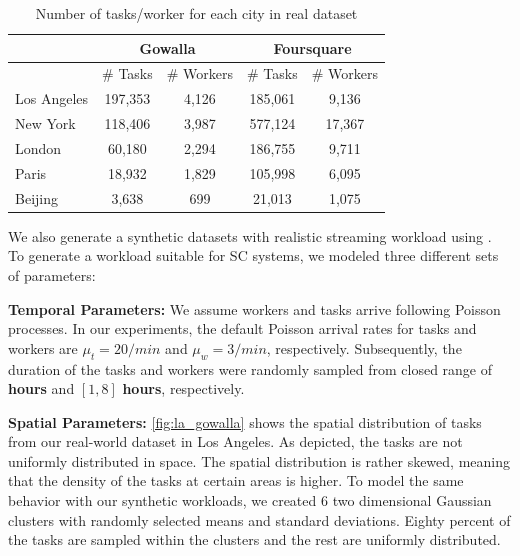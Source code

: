 \begin{table}[h]
\begin{center}
\begin{tabular}{| l || c | c || c | c |} \hline
			& \multicolumn{2}{c||}{Gowalla}		&\multicolumn{2}{c|}{Foursquare}		\\ \hline
			&	\# Tasks	&	\#  Workers		&	\#  Tasks	&	\#  Workers		\\ \hline
Los Angeles	&	197,353		&		4,126		&	185,061		&		9,136		\\ \hline
New York	&	118,406		&		3,987		&	577,124		& 		17,367		\\ \hline
London		& 	60,180		&		2,294		&	186,755		&		9,711		\\ \hline
Paris		&	18,932		&		1,829		&	105,998		&		6,095		\\ \hline
Beijing		&	3,638		&		699			&	21,013		&		1,075		\\ \hline
\end{tabular}
\caption{\small{Number of tasks/worker for each city in real dataset}}
\vspace{-0.2in}
\label{tab:flickr_stats}
\end{center}
\end{table}

We also generate a synthetic datasets with realistic streaming workload using \cite{To15}. To generate a workload suitable for SC systems, we modeled three different sets of parameters:

\noindent \textbf{Temporal Parameters:} We assume workers and tasks arrive following Poisson processes. In our experiments, the default Poisson arrival rates for tasks and workers are \boldmath$\mu_t = 20/min$ and $\mu_w = 3/min$, respectively. Subsequently, the duration of the tasks and workers were randomly sampled from closed range of \boldmath{$\left[1,4 \right]$} \textbf{hours} and $\left[1,8 \right]$ \textbf{hours}, respectively.

\noindent \textbf{Spatial Parameters:} \cref{fig:la_gowalla} shows the spatial distribution of tasks from our real-world dataset in Los Angeles. As depicted, the tasks are not uniformly distributed in space. The spatial distribution is rather skewed, meaning that the density of the tasks at certain areas is higher. To model the same behavior with our synthetic workloads, we created 6 two dimensional Gaussian clusters with randomly selected means and standard deviations. Eighty percent of the tasks are sampled within the clusters and the rest are uniformly distributed.

